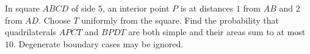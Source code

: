 In square $ABCD$ of side $5$, an interior point $P$ is at distances $1$ from $AB$ and $2$ from $AD$. Choose $T$ uniformly from the square. Find the probability that quadrilaterals $APCT$ and $BPDT$ are both simple and their areas sum to at most $10$. Degenerate boundary cases may be ignored.
